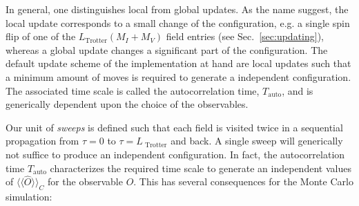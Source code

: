 \documentclass{SciPost}
\begin{document}
In general, one distinguishes local from global updates. As the name suggest, the local update corresponds to a small change of the configuration, e.g. a single spin flip of one of the $L_{\mathrm{Trotter}}(M_I+M_V)$ field entries (see Sec.~\ref{sec:updating}), whereas a global update changes a significant part of the configuration. The default update scheme of the implementation at hand are local updates such that a minimum amount of moves is required to generate a independent configuration. The associated time scale is called  the autocorrelation time, $T_\mathrm{auto}$, and is generically dependent upon the choice of the observables. 

 Our unit of \textit{sweeps} is defined such that each field is visited twice in a sequential propagation from $\tau = 0$ to $\tau = L_{\text{ Trotter}}$  and back.  A single sweep will  generically not  suffice to produce an independent  configuration.
In fact, the autocorrelation time $T_\mathrm{auto}$ characterizes the required time scale to generate an independent  values of $\langle\langle\hat{O}\rangle\rangle_C$ for the observable $O$. This has several consequences for the Monte Carlo simulation:
\end{document}
